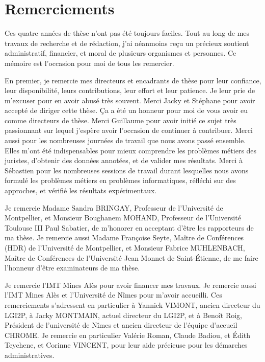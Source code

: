 \chapter*{Remerciements}
\label{sec:acknowledgement}
\begin{flushright}

\end{flushright}
Ces quatre années de thèse n'ont pas été toujours faciles. Tout au long de mes travaux de recherche et de rédaction, j'ai néanmoins reçu un précieux soutient administratif, financier, et moral de plusieurs organismes et personnes. 
Ce mémoire est l'occasion pour moi de tous les remercier.

En premier, je remercie mes directeurs et encadrants de thèse pour leur confiance, leur disponibilité, leurs contributions, leur effort et leur patience. Je leur prie de m'excuser pour en avoir abusé très souvent. Merci Jacky et Stéphane pour avoir accepté de diriger cette thèse. Ça a été un honneur pour moi de vous avoir eu comme directeurs de thèse. Merci Guillaume pour avoir initié ce sujet très passionnant sur lequel j'espère avoir l'occasion de continuer à contribuer. Merci aussi pour les nombreuses journées de travail que nous avons passé ensemble. Elles m'ont été indispensables pour mieux comprendre les problèmes métiers des juristes, d'obtenir des données annotées, et de valider mes résultats. Merci à Sébastien pour les nombreuses sessions de travail durant lesquelles nous avons formulé les problèmes métiers en problèmes informatiques, réfléchi sur des approches, et vérifié les résultats expérimentaux. 

Je remercie Madame Sandra BRINGAY, Professeur de l'Université de Montpellier, et 
Monsieur Boughanem MOHAND, Professeur de l'Université Toulouse III Paul Sabatier, de m'honorer en acceptant d'être les rapporteurs de ma thèse. Je remercie aussi Madame Françoise Seyte, Maître de Conférences (HDR) de l'Université de Montpellier, et  Monsieur Fabrice MUHLENBACH, Maître de Conférences de l'Université Jean Monnet de Saint-Étienne, de me faire l'honneur d'être examinateurs de ma thèse.

Je remercie l'IMT Mines Alès pour avoir financer mes travaux. Je remercie aussi l'IMT Mines Alès et l'Université de Nîmes pour m'avoir accueilli. Ces remerciements s'adressent en particulier à Yannick VIMONT, ancien directeur du LGI2P, à Jacky MONTMAIN, actuel directeur du LGI2P, et à Benoît Roig, Président de l'université de Nîmes et ancien directeur de l'équipe d'accueil CHROME. Je remercie en particulier Valérie Roman, Claude Badiou, et Édith  Teychene, et Corinne VINCENT, pour leur aide précieuse pour les démarches administratives.

